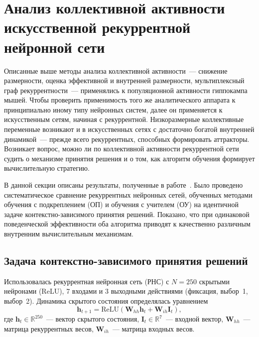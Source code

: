 
\section{Анализ коллективной активности искусственной рекуррентной нейронной сети}\label{sec:rnn}


Описанные выше методы анализа коллективной активности~--- снижение размерности, оценка эффективной и внутренней размерности, мультиплексный граф рекуррентности~--- применялись к популяционной активности гиппокампа мышей. Чтобы проверить применимость того же аналитического аппарата к принципиально иному типу нейронных систем, далее он применяется к искусственным сетям, начиная с рекуррентной. Низкоразмерные коллективные переменные возникают и в искусственных сетях с достаточно богатой внутренней динамикой~--- прежде всего рекуррентных, способных формировать аттракторы. Возникает вопрос, можно ли по коллективной активности рекуррентной сети судить о механизме принятия решения и о том, как алгоритм обучения формирует вычислительную стратегию.

В данной секции описаны результаты, полученные в работе~\cite{Kononov2025}. Было проведено систематическое сравнение рекуррентных нейронных сетей, обученных методами обучения с подкреплением (ОП) и обучения с учителем (ОУ) на идентичной задаче контекстно-зависимого принятия решений. Показано, что при одинаковой поведенческой эффективности оба алгоритма приводят к качественно различным внутренним вычислительным механизмам.


\subsection{Задача контекстно-зависимого принятия решений}

Использовалась рекуррентная нейронная сеть (РНС) с $N = 250$ скрытыми нейронами (ReLU), 7 входами и 3 выходными действиями (фиксация, выбор~1, выбор~2). Динамика скрытого состояния определялась уравнением
\begin{equation*}
\mathbf{h}_{t+1} = \text{ReLU}(\mathbf{W}_{hh} \mathbf{h}_t + \mathbf{W}_{ih} \mathbf{I}_t),
\end{equation*}
где $\mathbf{h}_t \in \mathbb{R}^{250}$~--- вектор скрытого состояния, $\mathbf{I}_t \in \mathbb{R}^{7}$~--- входной вектор, $\mathbf{W}_{hh}$~--- матрица рекуррентных весов, $\mathbf{W}_{ih}$~--- матрица входных весов.

